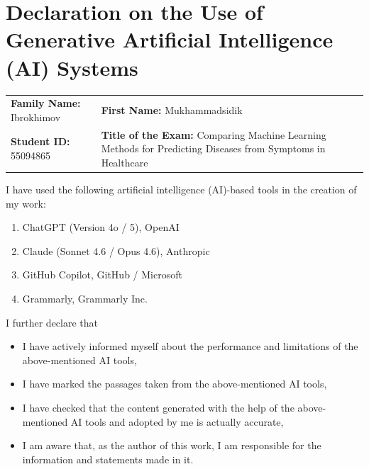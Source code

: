 \chapter*{Declaration on the Use of Generative Artificial Intelligence (AI) Systems}

\renewcommand{\arraystretch}{1.4}
\noindent
\begin{tabular}{@{}p{7.3cm} p{7.3cm}@{}}
\textbf{Family Name:} Ibrokhimov & \textbf{First Name:} Mukhammadsidik \\[0.3cm]
\textbf{Student ID:} 55094865 & \textbf{Title of the Exam:} Comparing Machine Learning Methods for Predicting Diseases from Symptoms in Healthcare \\
\end{tabular}

\vspace{0.8cm}

\noindent I have used the following artificial intelligence (AI)-based tools in the creation of my work:

\begin{enumerate}[leftmargin=2cm, itemsep=0.1cm]
    \item ChatGPT (Version 4o / 5), OpenAI
    \item Claude (Sonnet 4.6 / Opus 4.6), Anthropic
    \item GitHub Copilot, GitHub / Microsoft
    \item Grammarly, Grammarly Inc.
\end{enumerate}

\vspace{0.4cm}

\noindent I further declare that
\begin{itemize}[label={$\boxtimes$}, leftmargin=2cm, itemsep=0.1cm]
    \item I have actively informed myself about the performance and limitations of the above-mentioned AI tools,
    \item I have marked the passages taken from the above-mentioned AI tools,
    \item I have checked that the content generated with the help of the above-mentioned AI tools and adopted by me is actually accurate,
    \item I am aware that, as the author of this work, I am responsible for the information and statements made in it.
\end{itemize}

\vspace{0.4cm}

